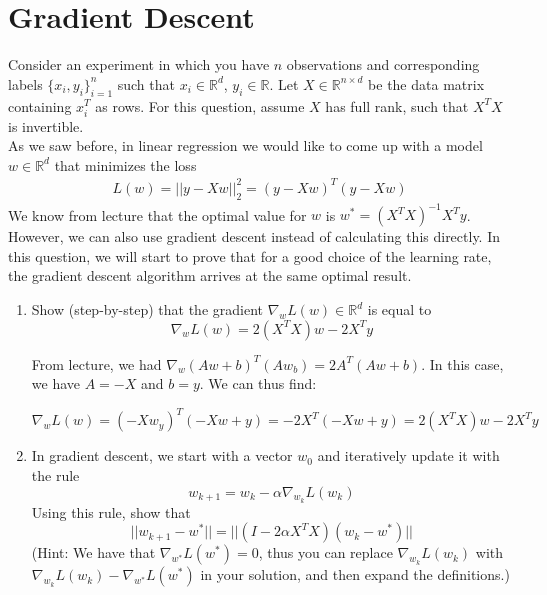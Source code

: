 \documentclass{article}
\begin{document}
\section*{Gradient Descent} 
\begin{aprob}
   Consider an experiment in which you have $n$ observations and corresponding labels $\{x_i, y_i\}_{i=1}^n$ such that $x_i \in \mathbb{R}^d$, $y_i \in \mathbb{R}$. Let $X \in \mathbb{R}^{n\times d}$ be the data matrix containing $x_i^T$ as rows. For this question, assume $X$ has full rank, such that $X^TX$ is invertible. \\
   
   As we saw before, in linear regression we would like to come up with a model $w \in \mathbb{R}^d$ that minimizes the loss
    \begin{align*}
    L(w) = ||y-Xw||_2^2 = (y-Xw)^T(y-Xw)
    \end{align*} 
    We know from lecture that the optimal value for $w$ is $w^* = (X^TX)^{-1}X^Ty$. However, we can also use gradient descent instead of calculating this directly. In this question, we will start to prove that for a good choice of the learning rate, the gradient descent algorithm arrives at the same optimal result.
    \begin{enumerate}
        \item {} Show (step-by-step) that the gradient $\nabla_w L(w) \in \mathbb{R}^d$ is equal to 
        $$\nabla_w L(w) = 2(X^TX)w - 2X^Ty$$
        
        From lecture, we had $\nabla_{w}(Aw+b)^T(Aw_b) = 2A^T(Aw+b)$. In this case, we have $A = -X$ and $b = y$. We can thus find:
    
     \begin{equation}
     \nabla_{w}L(w) = (-Xw_y)^T(-Xw+y) = -2X^T(-Xw + y) = 2(X^TX)w - 2X^Ty
     \end{equation}
        
        \item {} In gradient descent, we start with a vector $w_0$ and iteratively update it with the rule $$w_{k+1} = w_k - \alpha\nabla_{w_k}L(w_k)$$
        Using this rule, show that 
        $$||w_{k+1}-w^*|| = ||(I-2\alpha X^TX)(w_k-w^*)||$$
        (Hint: We have that $\nabla_{w^*}L(w^*) = 0$, thus you can replace $\nabla_{w_k}L(w_k)$ with $\nabla_{w_k}L(w_k)-\nabla_{w^*}L(w^*)$ in your solution, and then expand the definitions.)


\end{enumerate}
\end{aprob}
\end{document}

